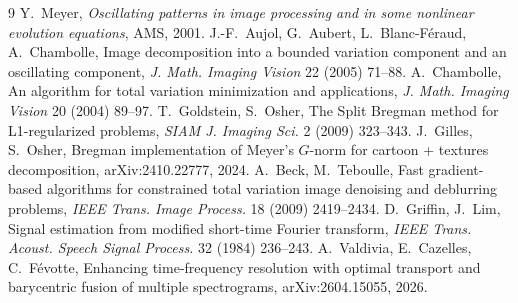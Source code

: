 \documentclass[11pt]{article}
\theoremstyle{definition}
\begin{document}
\begin{thebibliography}{9}
 Y.~Meyer, \emph{Oscillating patterns in image processing
and in some nonlinear evolution equations}, AMS, 2001.
 J.-F.~Aujol, G.~Aubert, L.~Blanc-F\'eraud, A.~Chambolle,
Image decomposition into a bounded variation component and an oscillating
component, \emph{J. Math. Imaging Vision} 22 (2005) 71--88.
 A.~Chambolle, An algorithm for total variation
minimization and applications, \emph{J. Math. Imaging Vision} 20 (2004)
89--97.
 T.~Goldstein, S.~Osher, The Split Bregman method for
L1-regularized problems, \emph{SIAM J. Imaging Sci.} 2 (2009) 323--343.
 J.~Gilles, S.~Osher, Bregman implementation of Meyer's
$G$-norm for cartoon + textures decomposition, arXiv:2410.22777, 2024.
 A.~Beck, M.~Teboulle, Fast gradient-based algorithms for
constrained total variation image denoising and deblurring problems,
\emph{IEEE Trans. Image Process.} 18 (2009) 2419--2434.
 D.~Griffin, J.~Lim, Signal estimation from modified
short-time Fourier transform, \emph{IEEE Trans. Acoust. Speech Signal
Process.} 32 (1984) 236--243.
 A.~Valdivia, E.~Cazelles, C.~F\'evotte, Enhancing
time-frequency resolution with optimal transport and barycentric fusion of
multiple spectrograms, arXiv:2604.15055, 2026.
\end{thebibliography}
\end{document}
